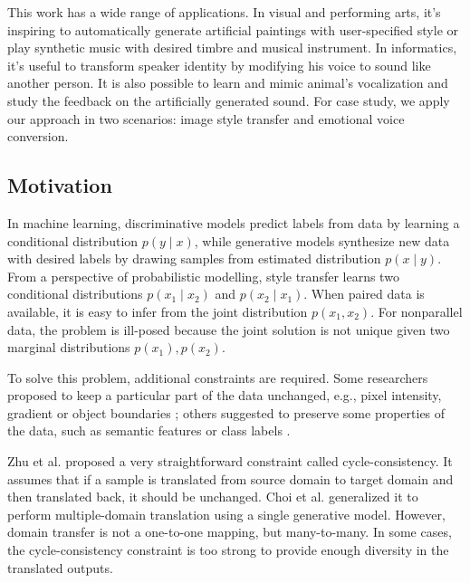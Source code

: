 \documentclass{article}
\begin{document}
This work has a wide range of applications. In visual and performing arts, it's inspiring to automatically generate artificial paintings with user-specified style or play synthetic music with desired timbre and musical instrument. In informatics, it's useful to transform speaker identity by modifying his voice to sound like another person. It is also possible to learn and mimic animal's vocalization and study the feedback on the artificially generated sound. For case study, we apply our approach in two scenarios: image style transfer and emotional voice conversion.

\subsection{Motivation} %
In machine learning, discriminative models predict labels from data by learning a conditional distribution $p(y\mid x)$, while generative models synthesize new data with desired labels by drawing samples from estimated distribution $p(x\mid y)$. From a perspective of probabilistic modelling, style transfer learns two conditional distributions $p(x_1\mid x_2)$ and $p(x_2\mid x_1)$. When paired data is available, it is easy to infer from the joint distribution $p(x_1,x_2)$. For nonparallel data, the problem is ill-posed because the joint solution is not unique given two marginal distributions $p(x_1), p(x_2)$.

To solve this problem, additional constraints are required. Some researchers proposed to keep a particular part of the data unchanged, e.g., pixel intensity, gradient or object boundaries \cite{8099501,Shrivastava_2017_CVPR}; others suggested to preserve some properties of the data, such as semantic features or class labels \cite{DBLP:journals/corr/TaigmanPW16}.

Zhu et al. \cite{Zhu_2017_ICCV} proposed a very straightforward constraint called cycle-consistency. It assumes that if a sample is translated from source domain to target domain and then translated back, it should be unchanged. Choi et al. \cite{Gong:2016:DAC:3045390.3045689} generalized it to perform multiple-domain translation using a single generative model. However, domain transfer is not a one-to-one mapping, but many-to-many. In some cases, the cycle-consistency constraint is too strong to provide enough diversity in the translated outputs.
\end{document}
